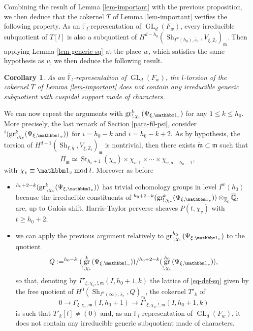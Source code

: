 \documentclass[JEP,XML,SOM,Unicode,published]{cedram}
\let\mathds\mathbbm
\newcommand{\NoChangel}[1]{%
\expandafter\let\csname old\string#1\endcsname=#1
\let#1=\relax
\newcommand{#1}{\mathcode`l="716C\csname old\string#1\endcsname\mathcode`l="7160 }%
}
\DeclareMathOperator{\GL}{GL}
\theoremstyle{plain}
\newtheorem{corol}[equation]{Corollary}
\theoremstyle{definition}
\numberwithin{equation}{subsection}
\newcommand\Fm{{\mathbb F}}
\newcommand\Qm{{\mathbb Q}}
\newcommand\Zm{{\mathbb Z}}
\DeclareMathOperator{\sh}{Sh}
\DeclareMathOperator{\st}{St}
\DeclareMathOperator{\gr}{gr}
\DeclareMathOperator{\Fil}{Fil}\NoChangel{\Fil}
\let \oo=\infty
\begin{document}
Combining the result of Lemma \ref{lem-important} with the previous
proposition, we then deduce that the cokernel $T$ of Lemma \ref{lem-important} verifies
the following property. As an $\overline \Fm_l$\nobreakdash-representation of $\GL_d(F_w)$, every irreducible
subquotient of $T[l]$ is also a subquotient of
$H^{d-h_0}(\sh_{I^w(h_0),\bar s_v},V_{\xi,\overline \Zm_l})_{\mathfrak m}$.
Then applying Lemma \ref{lem-generic-sq} at the place $w$, which satisfies the same hypothesis as $v$, we then deduce the following result.

\begin{corol} \label{coro-absurd}
As an $\overline \Fm_l$-representation of $\GL_d(F_w)$, the $l$-torsion of
the cokernel $T$ of Lemma \ref{lem-important}
does not contain any irreducible generic subquotient with cuspidal support made of characters.
\end{corol}

We can now repeat the arguments with $\gr^k_{!,\chi_v}(\Psi_{\xi,\mathds 1_v})$
for any $1 \leq k \leq h_0$. More precisely, \cf the last remark of Section \ref{para-fil-psi},
consider $\Fil^{i}(\gr^{k}_{!,\chi_c}(\Psi_{\xi,\mathds 1_v}))$
for $i=h_0-k$ and $i=h_0-k+2$. As by hypothesis, the torsion of
$H^{d-1}(\sh_{I,\bar \eta},V_{\xi,\overline \Zm_l})_{\mathfrak m}$
is nontrivial, then there exists $\widetilde{\mathfrak m} \subset \mathfrak m$ such that
\[
\Pi_{\widetilde{\mathfrak m}} \simeq
\st_{h_0+1}(\chi_v) \times \chi_{v,1} \times \cdots \times \chi_{v,d-h_0-1},
\]
with $\chi_v \equiv \mathds 1_v \bmod l$.
Moreover as before
\begin{itemize}
\item $\Fil^{h_0+2-k}(\gr^{k}_{!,\chi_v}(\Psi_{\xi,\mathds 1_v}))$
has trivial cohomology groups in level $I^w(h_0)$ because
the irreducible constituents of
$\Fil^{h_0+2-k}(\gr^{k}_{!,\chi_v}(\Psi_{\xi,\mathds 1_v}))
\otimes_{\overline \Zm_l} \overline \Qm_l$ are, up to Galois shift,
Harris-Taylor perverse
sheaves $P(t,\chi_v)$ with $t \geq h_0+2$;

\item we can apply the previous argument relatively to
$\gr^{h_0}_{!,\chi_v}(\Psi_{\xi,\mathds 1_v})$ to the
quotient
\[
Q:=\Fil^{h_0-k}(\gr^{k}_{!,\chi_v}(\Psi_{\xi,\mathds 1_v}))
/\Fil^{h_0+2-k}(\gr^{h_0}_{!,\chi_v}(\Psi_{\xi,\mathds 1_v})),
\]
so that, denoting by
$\Gamma'_{\xi,\chi_v,!,\mathfrak m} (I,h_0+1,k)$
the lattice of \eqref{eq-def-sq} given by the free quotient of
$H^0(\sh_{I^w(\oo),\bar s_v},Q)_{\mathfrak m}$, the cokernel $T'_k$ of
\[
0 \to \Gamma_{\xi,\chi_v,\mathfrak m}(I,h_0+1)
\to \Gamma'_{\xi,\chi_v,!,\mathfrak m}
(I,h_0+1,k)
\]
is such that $T'_k[l] \neq (0)$ and, as an $\overline \Fm_l$-representation of
$\GL_d(F_w)$, it does not contain any irreducible generic subquotient made of
characters.
\end{itemize}
\end{document}

